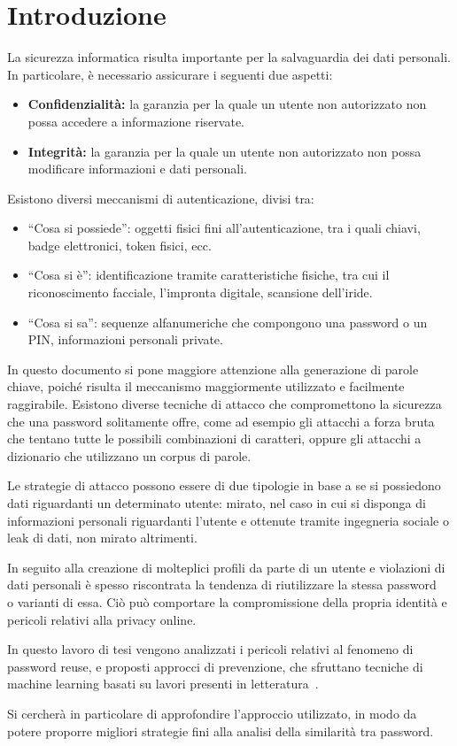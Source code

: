 \chapter*{Introduzione}
La sicurezza informatica risulta importante per la salvaguardia dei dati personali. In particolare, è necessario assicurare i seguenti due aspetti:
\begin{itemize}
    \item \textbf{Confidenzialità:} la garanzia per la quale un utente non autorizzato non possa accedere a informazione riservate.
    \item \textbf{Integrità:} la garanzia per la quale un utente non autorizzato non possa modificare informazioni e dati personali.
\end{itemize}
Esistono diversi meccanismi di autenticazione, divisi tra:
\begin{itemize}
    \item ``Cosa si possiede'': oggetti fisici fini all'autenticazione, tra i quali chiavi, badge elettronici, token fisici, ecc.
    \item ``Cosa si è'': identificazione tramite caratteristiche fisiche, tra cui il riconoscimento facciale, l'impronta digitale, scansione dell'iride.
    \item ``Cosa si sa'': sequenze alfanumeriche che compongono una password o un PIN, informazioni personali private.
\end{itemize}
In questo documento si pone maggiore attenzione alla generazione di parole chiave, poiché risulta il meccanismo maggiormente utilizzato e facilmente raggirabile. Esistono diverse tecniche di attacco che compromettono la sicurezza che una password solitamente offre, come ad esempio gli attacchi a forza bruta che tentano tutte le possibili combinazioni di caratteri, oppure gli attacchi a dizionario che utilizzano un corpus di parole.

Le strategie di attacco possono essere di due tipologie in base a se si possiedono dati riguardanti un determinato utente: mirato, nel caso in cui si disponga di informazioni personali riguardanti l'utente e ottenute tramite ingegneria sociale o leak di dati, non mirato altrimenti.

In seguito alla creazione di molteplici profili da parte di un utente e violazioni di dati personali è spesso riscontrata la tendenza di riutilizzare la stessa password ~\cite{google} o varianti di essa. Ciò può comportare la compromissione della propria identità e pericoli relativi alla privacy online.

In questo lavoro di tesi vengono analizzati i pericoli relativi al fenomeno di password reuse, e proposti approcci di prevenzione, che sfruttano tecniche di machine learning basati su lavori presenti in letteratura~\cite{bijeeta}.

Si cercherà in particolare di approfondire l'approccio utilizzato, in modo da potere proporre migliori strategie fini alla analisi della similarità tra password.